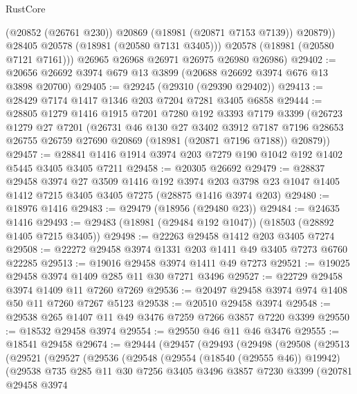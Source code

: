 \begin{lexlean}{RustCore}
\begin{coremodule}
              (@20852 (@26761 @230))
              @20869
              (@18981 (@20871 @7153 @7139))
              @20879))
          @28405
          @20578
          (@18981 (@20580 @7131 @3405)))
        @20578
        (@18981 (@20580 @7121 @7161)))
      @26965
      @26968
      @26971
      @26975
      @26980
      @26986)
@29402 := @20656 @26692 @3974 @679 @13 @3899 (@20688 @26692 @3974 @676 @13 @3898 @20700)
@29405 := @29245 (@29310 (@29390 @29402))
@29413 := @28429 @7174 @1417 @1346 @203 @7204 @7281 @3405 @6858
@29444 := @28805
    @1279
    @1416
    @1915
    @7201
    @7280
    @192
    @3393
    @7179
    @3399
    (@26723
      @1279
      @27
      @7201
      (@26731
        @46
        @130
        @27
        @3402
        @3912
        @7187
        @7196
        @28653
        @26755
        @26759
        @27690
        @20869
        (@18981 (@20871 @7196 @7188))
        @20879))
@29457 := @28841 @1416 @1914 @3974 @203 @7279 @190 @1042 @192 @1402 @5445 @3405 @3405 @7211
@29458 := @20305 @26692
@29479 := @28837
    @29458
    @3974
    @27
    @3509
    @1416
    @192
    @3974
    @203
    @3798
    @23
    @1047
    @1405
    @1412
    @7215
    @3405
    @3405
    @7275
    (@28875 @1416 @3974 @203)
@29480 := @18976 @1416
@29483 := @29479 (@18956 (@29480 @23))
@29484 := @24635 @1416
@29493 := @29483 (@18981 (@29484 @192 @1047)) (@18503 (@28892 @1405 @7215 @3405))
@29498 := @22263 @29458 @1412 @203 @3405 @7274
@29508 := @22272 @29458 @3974 @1331 @203 @1411 @49 @3405 @7273 @6760 @22285
@29513 := @19016 @29458 @3974 @1411 @49 @7273
@29521 := @19025 @29458 @3974 @1409 @285 @11 @30 @7271 @3496
@29527 := @22729 @29458 @3974 @1409 @11 @7260 @7269
@29536 := @20497 @29458 @3974 @974 @1408 @50 @11 @7260 @7267 @5123
@29538 := @20510 @29458 @3974
@29548 := @29538 @265 @1407 @11 @49 @3476 @7259 @7266 @3857 @7220 @3399
@29550 := @18532 @29458 @3974
@29554 := @29550 @46 @11 @46 @3476
@29555 := @18541 @29458
@29674 := @29444
    (@29457
      (@29493
        (@29498
          (@29508
            (@29513
              (@29521
                (@29527
                  (@29536
                    (@29548
                      (@29554 (@18540 (@29555 @46)) @19942)
                      (@29538
                        @735
                        @285
                        @11
                        @30
                        @7256
                        @3405
                        @3496
                        @3857
                        @7230
                        @3399
                        (@20781
                          @29458
                          @3974

\end{coremodule}
\end{lexlean}
